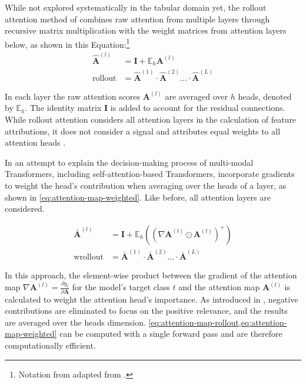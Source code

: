 While not explored systematically in the tabular domain yet, the rollout attention method of \textcite[][4192]{abnarQuantifyingAttentionFlow2020} combines raw attention from multiple layers through recursive matrix multiplication with the weight matrices from attention layers below, as shown in this Equation:\footnote{Notation from adapted from \textcite[][786]{cheferTransformerInterpretabilityAttention2021}.}
\begin{equation}
    \begin{aligned}
        \hat{\mathbf{A}}^{(l)}    & =\mathbf{I}+\mathbb{E}_h \mathbf{A}^{(l)}                                              \\
        \operatorname { rollout } & =\hat{\mathbf{A}}^{(1)} \cdot \hat{\mathbf{A}}^{(2)} \ldots\cdot\hat{\mathbf{A}}^{(L)}
    \end{aligned}
    \label{eq:attention-map-rollout}
\end{equation}

In each layer the raw attention scores $\mathbf{A}^{(l)}$ are averaged over $h$ heads, denoted by $\mathbb{E}_h$. The identity matrix $\mathbf{I}$ is added to account for the residual connections. While rollout attention considers all attention layers in the calculation of feature attributions, it does not consider a signal and attributes equal weights to all attention heads \autocite[][786]{cheferTransformerInterpretabilityAttention2021}.

In an attempt to explain the decision-making process of multi-modal Transformers, including self-attention-based Transformers, \textcite[][399]{cheferGenericAttentionmodelExplainability2021} incorporate gradients to weight the head's contribution when averaging over the heads of a layer, as shown in \cref{eq:attention-map-weighted}. Like before, all attention layers are considered.

\begin{equation}
    \begin{aligned}
        \bar{\mathbf{A}}^{(l)}   & =\mathbf{I} + \mathbb{E}_h\left(\left(\nabla \mathbf{A}^{(l)} \odot \mathbf{A}^{(l)}\right)^{+}\right) \\
        \operatorname {wrollout} & =\bar{\mathbf{A}}^{(1)} \cdot \bar{\mathbf{A}}^{(2)} \ldots \cdot \bar{\mathbf{A}}^{(L)}
    \end{aligned}
    \label{eq:attention-map-weighted}
\end{equation}

In this approach, the element-wise product between the gradient of the attention map $\nabla \mathbf{A}^{(l)}=\frac{\partial y_t}{\partial \mathbf{A}}$ for the model's target class $t$ and the attention map $\mathbf{A}^{(l)}$ is calculated to weight the attention head's importance. As introduced in \textcite[][786]{cheferTransformerInterpretabilityAttention2021}, negative contributions are eliminated to focus on the positive relevance, and the results are averaged over the heads dimension. \cref{eq:attention-map-rollout,eq:attention-map-weighted} can be computed with a single forward pass and are therefore computationally efficient.